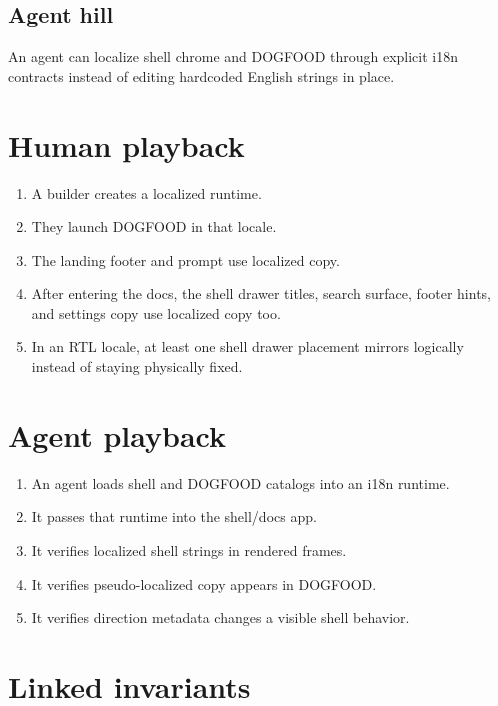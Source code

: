 \subsection{Agent hill}\label{record-194-agent-hill}

An agent can localize shell chrome and DOGFOOD through explicit i18n contracts instead of editing hardcoded English strings in place.

\section{Human playback}\label{record-194-human-playback}

\begin{enumerate}
\def\labelenumi{\arabic{enumi}.}
\tightlist
\item
  A builder creates a localized runtime.
\item
  They launch DOGFOOD in that locale.
\item
  The landing footer and prompt use localized copy.
\item
  After entering the docs, the shell drawer titles, search surface, footer hints, and settings copy use localized copy too.
\item
  In an RTL locale, at least one shell drawer placement mirrors logically instead of staying physically fixed.
\end{enumerate}

\section{Agent playback}\label{record-194-agent-playback}

\begin{enumerate}
\def\labelenumi{\arabic{enumi}.}
\tightlist
\item
  An agent loads shell and DOGFOOD catalogs into an i18n runtime.
\item
  It passes that runtime into the shell/docs app.
\item
  It verifies localized shell strings in rendered frames.
\item
  It verifies pseudo-localized copy appears in DOGFOOD.
\item
  It verifies direction metadata changes a visible shell behavior.
\end{enumerate}

\section{Linked invariants}\label{record-194-linked-invariants}

